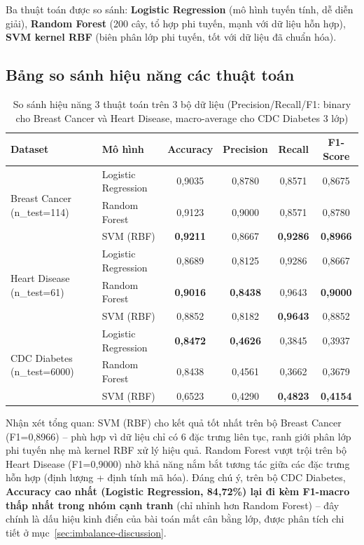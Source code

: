 Ba thuật toán được so sánh: \textbf{Logistic Regression} (mô hình tuyến tính, dễ diễn giải), \textbf{Random Forest} (200 cây, tổ hợp phi tuyến, mạnh với dữ liệu hỗn hợp), \textbf{SVM kernel RBF} (biên phân lớp phi tuyến, tốt với dữ liệu đã chuẩn hóa).

\subsection{Bảng so sánh hiệu năng các thuật toán}

\begin{table}[H]
\centering
\caption{So sánh hiệu năng 3 thuật toán trên 3 bộ dữ liệu (Precision/Recall/F1: binary cho Breast Cancer và Heart Disease, macro-average cho CDC Diabetes 3 lớp)}
\label{tab:classification-results}
\label{tab:chapter4_classification_metrics}
\begin{tabular}{llcccc}
\toprule
\textbf{Dataset} & \textbf{Mô hình} & \textbf{Accuracy} & \textbf{Precision} & \textbf{Recall} & \textbf{F1-Score} \\
\midrule
\multirow{3}{*}{Breast Cancer (n\_test=114)} & Logistic Regression & 0,9035 & 0,8780 & 0,8571 & 0,8675 \\
 & Random Forest & 0,9123 & 0,9000 & 0,8571 & 0,8780 \\
 & SVM (RBF) & \textbf{0,9211} & 0,8667 & \textbf{0,9286} & \textbf{0,8966} \\
\midrule
\multirow{3}{*}{Heart Disease (n\_test=61)} & Logistic Regression & 0,8689 & 0,8125 & 0,9286 & 0,8667 \\
 & Random Forest & \textbf{0,9016} & \textbf{0,8438} & 0,9643 & \textbf{0,9000} \\
 & SVM (RBF) & 0,8852 & 0,8182 & \textbf{0,9643} & 0,8852 \\
\midrule
\multirow{3}{*}{CDC Diabetes (n\_test=6000)} & Logistic Regression & \textbf{0,8472} & \textbf{0,4626} & 0,3845 & 0,3937 \\
 & Random Forest & 0,8438 & 0,4561 & 0,3662 & 0,3679 \\
 & SVM (RBF) & 0,6523 & 0,4290 & \textbf{0,4823} & \textbf{0,4154} \\
\bottomrule
\end{tabular}
\end{table}

Nhận xét tổng quan: SVM (RBF) cho kết quả tốt nhất trên bộ Breast Cancer (F1=0,8966) -- phù hợp vì dữ liệu chỉ có 6 đặc trưng liên tục, ranh giới phân lớp phi tuyến nhẹ mà kernel RBF xử lý hiệu quả. Random Forest vượt trội trên bộ Heart Disease (F1=0,9000) nhờ khả năng nắm bắt tương tác giữa các đặc trưng hỗn hợp (định lượng + định tính mã hóa). Đáng chú ý, trên bộ CDC Diabetes, \textbf{Accuracy cao nhất (Logistic Regression, 84,72\%) lại đi kèm F1-macro thấp nhất trong nhóm cạnh tranh} (chỉ nhỉnh hơn Random Forest) -- đây chính là dấu hiệu kinh điển của bài toán mất cân bằng lớp, được phân tích chi tiết ở mục~\ref{sec:imbalance-discussion}.

